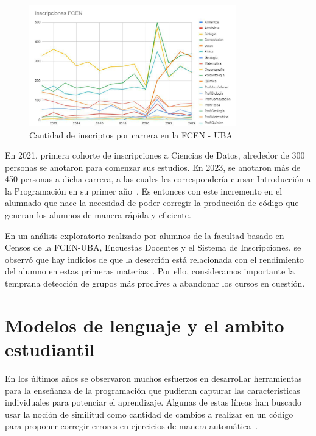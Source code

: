 \documentclass[11pt,a4paper,twoside,openany]{tesis}
\begin{document}
\begin{figure}[H]
    \centering
    \includegraphics[width=0.8\textwidth]{imagenes/inscriptos-por-carrera.jpg}
    \caption{Cantidad de inscriptos por carrera en la FCEN - UBA ~\cite{DOV}}
    \label{grafico-dov}
\end{figure}

En 2021, primera cohorte de inscripciones a Ciencias de Datos, alrededor de 300 personas se anotaron para comenzar sus estudios. En 2023, se anotaron más de 450 personas a dicha carrera, a las cuales les correspondería cursar Introducción a la Programación en su primer año~\cite{primeros-datos}. Es entonces con este incremento en el alumnado que nace la necesidad de poder corregir la producción de código que generan los alumnos de manera rápida y eficiente. 

En un análisis exploratorio realizado por alumnos de la facultad basado en Censos de la FCEN-UBA, Encuestas Docentes y el Sistema de Inscripciones, se observó que hay indicios de que la deserción está relacionada con el rendimiento del alumno en estas primeras materias~\cite{analisis-exploratorio}. Por ello, consideramos importante la temprana detección de grupos más proclives a abandonar los cursos en cuestión. 

\section{Modelos de lenguaje y el ambito estudiantil}

En los últimos años se observaron muchos esfuerzos en desarrollar herramientas para la enseñanza de la programación que pudieran capturar las características individuales para potenciar el aprendizaje. Algunas de estas líneas han buscado usar la noción de similitud como cantidad de cambios a realizar en un código para proponer corregir errores en ejercicios de manera automática~\cite{gulwani2018automated}.
\end{document}
